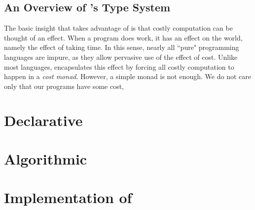 \subsection{An Overview of \lambdaamor's Type System}
The basic insight that \lambdaamor takes advantage of is that costly computation can be thought of an effect. When a program does work, it has an effect on the world, namely the effect of taking time. In this sense, nearly all ``pure" programming languages are impure, as they allow pervasive use of the effect of cost. Unlike most languages, \lambdaamor encapsulates this effect by forcing all costly computation to happen in a \textit{cost monad}. However, a simple monad is not enough. We do not care only that our programs have some cost, 


\section{Declarative \lambdaamor}
\section{Algorithmic \lambdaamor}
\section{Implementation of \lambdaamor}
